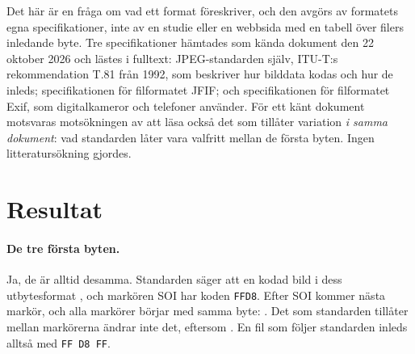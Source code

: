 Det här är en fråga om vad ett format föreskriver, och den avgörs av
formatets egna specifikationer, inte av en studie eller en webbsida med
en tabell över filers inledande byte.  Tre specifikationer hämtades som
kända dokument den 22 oktober 2026 och lästes i fulltext: JPEG-standarden
själv, ITU-T:s rekommendation T.81 från 1992\autocite{ITUT81}, som
beskriver hur bilddata kodas och hur de inleds; specifikationen för
filformatet JFIF\autocite{Hamilton1992JFIF}; och specifikationen för
filformatet Exif, som digitalkameror och telefoner använder\autocite{CIPA2016Exif}.
För ett känt dokument motsvaras motsökningen av att läsa också det som
tillåter variation \emph{i samma dokument}: vad standarden låter vara
valfritt mellan de första byten.  Ingen litteratursökning gjordes.


\section{Resultat}
\label{sec:jpeg-resultat}

\paragraph{De tre första byten.}  Ja, de är alltid desamma.  Standarden
säger att en kodad bild i dess utbytesformat
, och markören
SOI har koden \texttt{FFD8}\autocite[32]{ITUT81}.  Efter SOI kommer
nästa markör, och alla markörer börjar med samma byte:
.  Det som
standarden tillåter mellan markörerna ändrar inte det, eftersom
.  En fil som
följer standarden inleds alltså med \texttt{FF D8 FF}.

